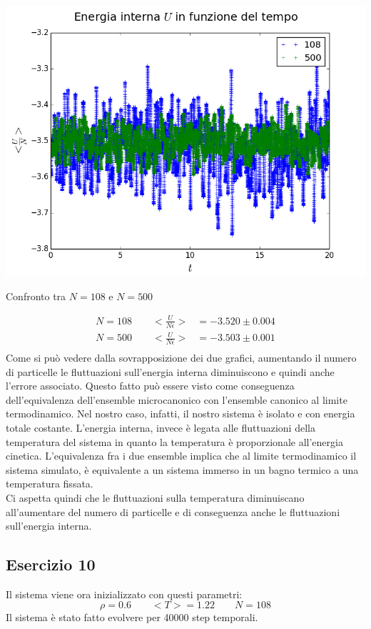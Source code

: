 \begin{myfig}[h]
	\includegraphics[scale=0.5]{soft_core/9cfr.png}
	\caption{Confronto tra $N=108$ e $N=500$}
\end{myfig}
\begin{align}
N=108 \qquad <\frac{U}{N \epsilon}> &= -3.520 \pm 0.004 \\
N=500 \qquad <\frac{U}{N \epsilon}> &= -3.503 \pm 0.001 \\
\end{align}
Come si può vedere dalla sovrapposizione dei due grafici, aumentando il numero di particelle le fluttuazioni sull'energia interna diminuiscono e quindi anche l'errore associato.
Questo fatto può essere visto come conseguenza dell'equivalenza dell'ensemble microcanonico con l'ensemble canonico al limite termodinamico.
Nel nostro caso, infatti, il nostro sistema è isolato e con energia totale costante. L'energia interna, invece è legata alle fluttuazioni della temperatura del sistema in quanto la temperatura è proporzionale all'energia cinetica.
L'equivalenza fra i due ensemble implica che al limite termodinamico il sistema simulato, è equivalente a un sistema immerso in un bagno termico a una temperatura fissata.\\
Ci aspetta quindi che le fluttuazioni sulla temperatura diminuiscano all'aumentare del numero di particelle e di conseguenza anche le fluttuazioni sull'energia interna.


\subsection{Esercizio 10}
Il sistema viene ora inizializzato con questi parametri:
$$
	\rho = 0.6 \qquad <T> = 1.22 \qquad N=108
$$
Il sistema è stato fatto evolvere per 40000 step temporali.\\
